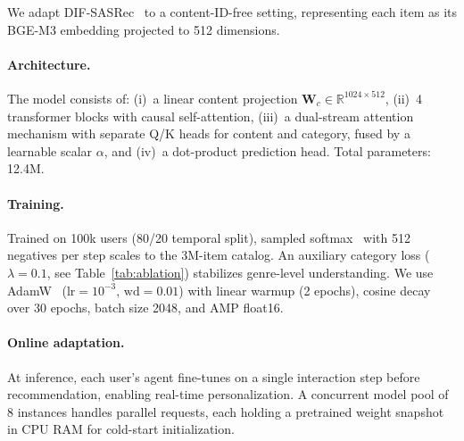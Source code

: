 We adapt DIF-SASRec~\cite{xie2022difsr} to a content-ID-free setting,
representing each item as its BGE-M3 embedding projected to 512 dimensions.

\paragraph{Architecture.}
The model consists of:
(i)~a linear content projection $\mathbf{W}_c \in \mathbb{R}^{1024 \times 512}$,
(ii)~4 transformer blocks with causal self-attention,
(iii)~a dual-stream attention mechanism with separate Q/K heads for content
and category, fused by a learnable scalar $\alpha$, and
(iv)~a dot-product prediction head.
Total parameters: 12.4M.

\paragraph{Training.}
Trained on 100k users (80/20 temporal split), sampled softmax~\cite{jean2015using} with 512
negatives per step scales to the 3M-item catalog. An auxiliary category loss
($\lambda = 0.1$, see Table~\ref{tab:ablation}) stabilizes genre-level understanding.
We use AdamW~\cite{loshchilov2019decoupled} ($\text{lr}=10^{-3}$,
$\text{wd}=0.01$) with linear warmup (2 epochs), cosine decay~\cite{loshchilov2017sgdr} over 30 epochs,
batch size 2048, and AMP float16.

\paragraph{Online adaptation.}
At inference, each user's agent fine-tunes on a single interaction step before
recommendation, enabling real-time personalization.
A concurrent model pool of 8 instances handles parallel requests, each
holding a pretrained weight snapshot in CPU RAM for cold-start initialization.
